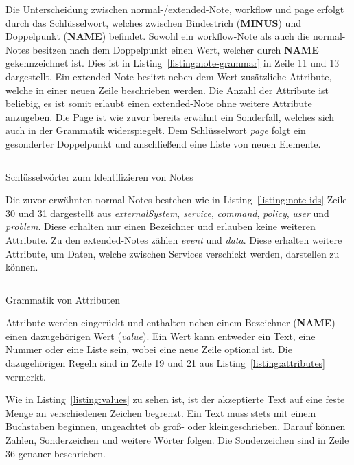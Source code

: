 Die Unterscheidung zwischen normal-/extended-Note, workflow und page erfolgt durch das Schlüsselwort, welches zwischen Bindestrich (\textbf{MINUS}) und Doppelpunkt (\textbf{NAME}) befindet.
Sowohl ein workflow-Note als auch die normal-Notes besitzen nach dem Doppelpunkt einen Wert, welcher durch \textbf{NAME} gekennzeichnet ist.
Dies ist in Listing~\ref{listing:note-grammar} in Zeile 11 und 13 dargestellt.
Ein extended-Note besitzt neben dem Wert zusätzliche Attribute, welche in einer neuen Zeile beschrieben werden.
Die Anzahl der Attribute ist beliebig, es ist somit erlaubt einen extended-Note ohne weitere Attribute anzugeben.
Die Page ist wie zuvor bereits erwähnt ein Sonderfall, welches sich auch in der Grammatik widerspiegelt.
Dem Schlüsselwort \textit{page} folgt ein gesonderter Doppelpunkt und anschließend eine Liste von neuen Elemente.

\begin{listing}[!ht]
    \inputminted[firstnumber=30]{antlr-java}{listings/3.1.3/Keywords.g4}
    \caption{Schlüsselwörter zum Identifizieren von Notes}
    \label{listing:note-ids}
\end{listing}

Die zuvor erwähnten normal-Notes bestehen wie in Listing~\ref{listing:note-ids} Zeile 30 und 31 dargestellt aus \textit{externalSystem}, \textit{service}, \textit{command}, \textit{policy}, \textit{user} und \textit{problem}.
Diese erhalten nur einen Bezeichner und erlauben keine weiteren Attribute.
Zu den extended-Notes zählen \textit{event} und \textit{data}.
Diese erhalten weitere Attribute, um Daten, welche zwischen Services verschickt werden, darstellen zu können.

\begin{listing}[!ht]
    \inputminted[firstnumber=19]{antlr-java}{listings/3.1.3/Attribute.g4}
    \caption{Grammatik von Attributen}
    \label{listing:attributes}
\end{listing}

Attribute werden eingerückt und enthalten neben einem Bezeichner (\textbf{NAME}) einen dazugehörigen Wert (\textit{value}).
Ein Wert kann entweder ein Text, eine Nummer oder eine Liste sein, wobei eine neue Zeile optional ist.
Die dazugehörigen Regeln sind in Zeile 19 und 21 aus Listing~\ref{listing:attributes} vermerkt.

Wie in Listing~\ref{listing:values} zu sehen ist, ist der akzeptierte Text auf eine feste Menge an verschiedenen Zeichen begrenzt.
Ein Text muss stets mit einem Buchstaben beginnen, ungeachtet ob groß- oder kleingeschrieben.
Darauf können Zahlen, Sonderzeichen und weitere Wörter folgen.
Die Sonderzeichen sind in Zeile 36 genauer beschrieben.

